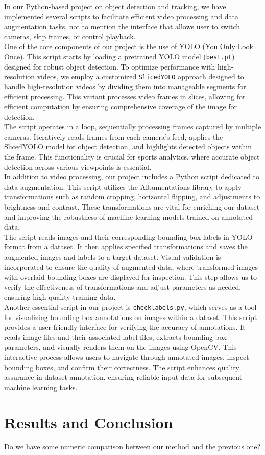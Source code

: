 \documentclass{template}
\begin{document}
In our Python-based project on object detection and tracking, we have implemented several scripts to facilitate efficient video processing and data augmentation tasks, not to mention the interface that allows user to switch cameras, skip frames, or control playback.
\\
One of the core components of our project is the use of YOLO (You Only Look Once). This script starts by loading a pretrained YOLO model (\texttt{best.pt}) designed for robust object detection. To optimize performance with high-resolution videos, we employ a customized \texttt{SlicedYOLO} approach designed to handle high-resolution videos by dividing them into manageable segments for efficient processing. This variant processes video frames in slices, allowing for efficient computation by ensuring comprehensive coverage of the image for detection.
\\
The script operates in a loop, sequentially processing frames captured by multiple cameras. Iteratively reads frames from each camera’s feed, applies the SlicedYOLO model for object detection, and highlights detected objects within the frame. This functionality is crucial for sports analytics, where accurate object detection across various viewpoints is essential.
\\
In addition to video processing, our project includes a Python script dedicated to data augmentation. This script utilizes the Albumentations library to apply transformations such as random cropping, horizontal flipping, and adjustments to brightness and contrast. These transformations are vital for enriching our dataset and improving the robustness of machine learning models trained on annotated data.
\\
The script reads images and their corresponding bounding box labels in YOLO format from a dataset. It then applies specified transformations and saves the augmented images and labels to a target dataset. Visual validation is incorporated to ensure the quality of augmented data, where transformed images with overlaid bounding boxes are displayed for inspection. This step allows us to verify the effectiveness of transformations and adjust parameters as needed, ensuring high-quality training data.
\\
Another essential script in our project is \texttt{checklabels.py}, which serves as a tool for visualizing bounding box annotations on images within a dataset. This script provides a user-friendly interface for verifying the accuracy of annotations. It reads image files and their associated label files, extracts bounding box parameters, and visually renders them on the images using OpenCV. This interactive process allows users to navigate through annotated images, inspect bounding boxes, and confirm their correctness. The script enhances quality assurance in dataset annotation, ensuring reliable input data for subsequent machine learning tasks.

\chapter{Results and Conclusion}
Do we have some numeric comparison between our method and the previous one?
\cite{gulawani2006cfd}

\appendix
\end{document}
